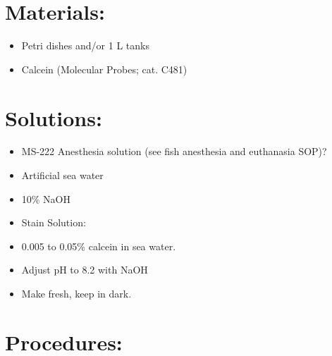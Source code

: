 \documentclass[
  letterpaper,
  DIV=11,
  numbers=noendperiod]{scrreprt}
\providecommand{\tightlist}{%
  \setlength{\itemsep}{0pt}\setlength{\parskip}{0pt}}\usepackage{longtable,booktabs,array}
\begin{document}
\hypertarget{materials-60}{%
\section{Materials:}\label{materials-60}}

\begin{itemize}
\tightlist
\item
  Petri dishes and/or 1 L tanks
\item
  Calcein (Molecular Probes; cat. C481)
\end{itemize}

\hypertarget{solutions-51}{%
\section{Solutions:}\label{solutions-51}}

\begin{itemize}
\tightlist
\item
  MS-222 Anesthesia solution (see fish anesthesia and euthanasia SOP)?
\item
  Artificial sea water
\item
  10\% NaOH
\item
  Stain Solution:
\item
  0.005 to 0.05\% calcein in sea water.
\item
  Adjust pH to 8.2 with NaOH
\item
  Make fresh, keep in dark.
\end{itemize}

\hypertarget{procedures-2}{%
\section{Procedures:}\label{procedures-2}}
\end{document}
